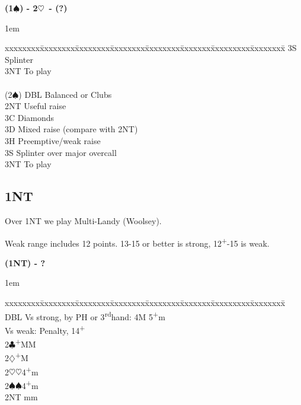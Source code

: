 \documentclass[10pt]{article}
\renewcommand{\c}{$\clubsuit$}
\renewcommand{\d}{$\diamondsuit$}
\newcommand{\h}{$\heartsuit$}
\newcommand{\s}{$\spadesuit$}
\newcommand{\p}{\textsuperscript{+}}
\newcommand{\x}{DBL}
\newcommand{\rdh}{3\textsuperscript{rd}}
\newenvironment{bidtable}[1][]
{\textbf{#1}
  \begin{adjustwidth}{1em}{}
    \addvspace{2pt}
    \begin{tabbing}
      xxxxxxxx\=xxxxxxxx\=xxxxxxxx\=xxxxxxxx\=xxxxxxxx\=xxxxxxx\=xxxxxxxxx\=xxxxxxxx\=\kill}
{\end{tabbing}\end{adjustwidth}\bigskip}%
\begin{document}
\begin{bidtable}[(1\s) - 2\h\ - (?)]
       \> 3S   \> Splinter                                                                         \\
       \> 3NT  \> To play                                                                          \\
                                                                                                   \\
(2\s)  \> DBL  \> Balanced or Clubs                                                                \\
       \> 2NT  \> Useful raise                                                                     \\
       \> 3C   \> Diamonds                                                                         \\
       \> 3D   \> Mixed raise (compare with 2NT)                                                   \\
       \> 3H   \> Preemptive/weak raise                                                            \\
       \> 3S   \> Splinter over major overcall                                                     \\
       \> 3NT  \> To play
\end{bidtable}



\subsection{1NT}

Over 1NT we play Multi-Landy (Woolsey).

Weak range includes 12 points. 13-15 or better is strong, 12\p-15 is weak.

\begin{bidtable}[(1NT) - ?]
\x  \> Vs strong, by PH or \rdh hand: 4M 5\p m    \\
    \> Vs weak: Penalty, 14\p \\
2\c {}\p MM                \\
2\d {}\p M                  \\
2\h {}\h 4\p m              \\
2\s {}\s 4\p m              \\
2NT  mm                  \\
\end{bidtable}

\end{document}
